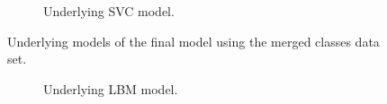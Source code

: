 \begin{figure}[ht]
\begin{subfigure}{.45\textwidth}
        \captionsetup{width=0.8\linewidth}
        \captionsetup{justification=centering}
        \caption{Underlying SVC model.}
    \end{subfigure}
    \captionsetup{width=0.9\linewidth}
    \captionsetup{justification=centering}
    \caption{Underlying models of the final model using the merged classes data set.}
\end{figure}

\begin{figure}[ht]
    \centering
    \begin{subfigure}{.45\textwidth}
        \centering
        \captionsetup{width=0.8\linewidth}
        \captionsetup{justification=centering}
        \caption{Underlying LBM model.}
    \end{subfigure}
    \hspace{1cm}
    \begin{subfigure}{.45\textwidth}
        \centering

\end{subfigure}
\end{figure}
